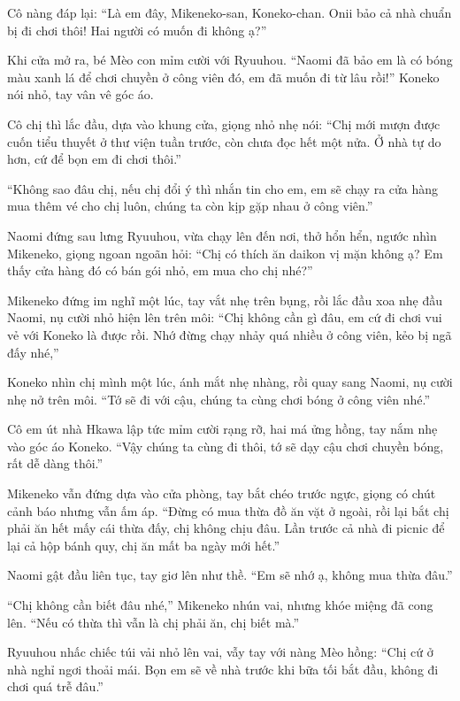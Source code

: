 ﻿\documentclass[../main.tex]{subfiles}
\begin{document}
Cô nàng đáp lại: ``Là em đây, Mikeneko-san, Koneko-chan. Onii bảo cả nhà chuẩn bị đi chơi thôi! Hai người có muốn đi không ạ?''

Khi cửa mở ra, bé Mèo con mỉm cười với Ryuuhou. ``Naomi đã bảo em là có bóng màu xanh lá để chơi chuyền ở công viên đó, em đã muốn đi từ lâu rồi!'' Koneko nói nhỏ, tay vân vê góc áo.

Cô chị thì lắc đầu, dựa vào khung cửa, giọng nhỏ nhẹ nói: ``Chị mới mượn được cuốn tiểu thuyết ở thư viện tuần trước, còn chưa đọc hết một nửa. Ở nhà tự do hơn, cứ để bọn em đi chơi thôi.''

``Không sao đâu chị, nếu chị đổi ý thì nhắn tin cho em, em sẽ chạy ra cửa hàng mua thêm vé cho chị luôn, chúng ta còn kịp gặp nhau ở công viên.''

Naomi đứng sau lưng Ryuuhou, vừa chạy lên đến nơi, thở hổn hển, ngước nhìn Mikeneko, giọng ngoan ngoãn hỏi: ``Chị có thích ăn daikon vị mặn không ạ? Em thấy cửa hàng đó có bán gói nhỏ, em mua cho chị nhé?''

Mikeneko đứng im nghĩ một lúc, tay vắt nhẹ trên bụng, rồi lắc đầu xoa nhẹ đầu Naomi, nụ cười nhỏ hiện lên trên môi: ``Chị không cần gì đâu, em cứ đi chơi vui vẻ với Koneko là được rồi. Nhớ đừng chạy nhảy quá nhiều ở công viên, kẻo bị ngã đấy nhé,''

Koneko nhìn chị mình một lúc, ánh mắt nhẹ nhàng, rồi quay sang Naomi, nụ cười nhẹ nở trên môi. ``Tớ sẽ đi với cậu, chúng ta cùng chơi bóng ở công viên nhé.''

Cô em út nhà Hkawa lập tức mỉm cười rạng rỡ, hai má ửng hồng, tay nắm nhẹ vào góc áo Koneko. ``Vậy chúng ta cùng đi thôi, tớ sẽ dạy cậu chơi chuyền bóng, rất dễ dàng thôi.''

Mikeneko vẫn đứng dựa vào cửa phòng, tay bắt chéo trước ngực, giọng có chút cảnh báo nhưng vẫn ấm áp. ``Đừng có mua thừa đồ ăn vặt ở ngoài, rồi lại bắt chị phải ăn hết mấy cái thừa đấy, chị không chịu đâu. Lần trước cả nhà đi picnic để lại cả hộp bánh quy, chị ăn mất ba ngày mới hết.''

Naomi gật đầu liên tục, tay giơ lên như thề. ``Em sẽ nhớ ạ, không mua thừa đâu.''

``Chị không cần biết đâu nhé,'' Mikeneko nhún vai, nhưng khóe miệng đã cong lên. ``Nếu có thừa thì vẫn là chị phải ăn, chị biết mà.''

Ryuuhou nhấc chiếc túi vải nhỏ lên vai, vẫy tay với nàng Mèo hồng: ``Chị cứ ở nhà nghỉ ngơi thoải mái. Bọn em sẽ về nhà trước khi bữa tối bắt đầu, không đi chơi quá trễ đâu.''
\end{document}
